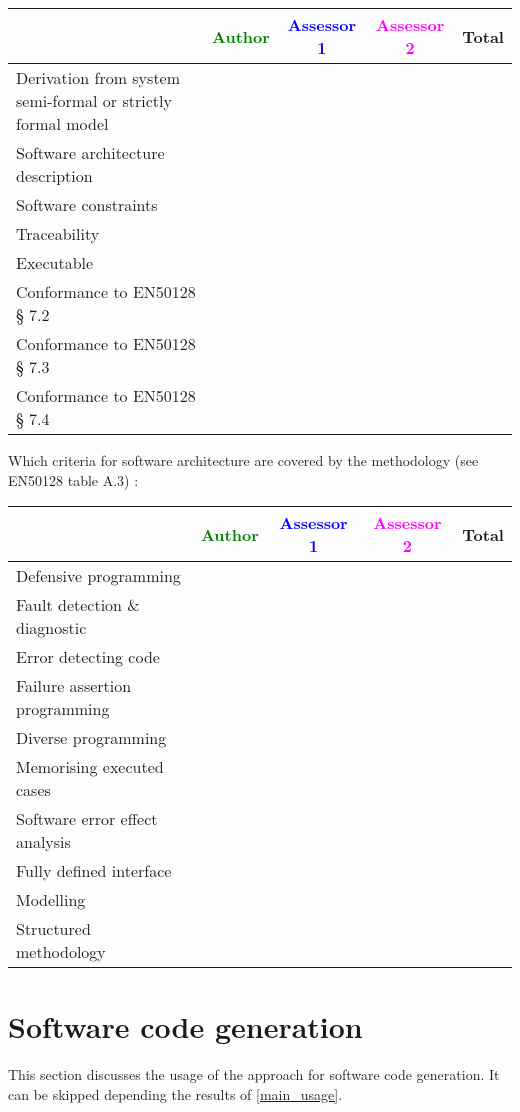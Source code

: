 \begin{tabular}{|l | c | c | c | c|}
\hline
& \textcolor{green}{Author} & \textcolor{blue}{Assessor 1} & \textcolor{magenta}{Assessor 2} & Total \\
\hline
Derivation from system semi-formal or strictly formal model  & & & &  \\
\hline 
Software architecture description  & & & &  \\
\hline
Software constraints  & & & &  \\
\hline
Traceability  & & & &  \\
\hline
Executable  & & & &  \\
\hline
Conformance to EN50128 § 7.2  & & & &  \\
\hline
Conformance to EN50128 § 7.3  & & & &  \\
\hline
Conformance to EN50128 § 7.4  & & & &  \\
\hline
\end{tabular}

Which criteria for software architecture are covered by the methodology
(see EN50128 table A.3) :

\begin{tabular}{|l | c | c | c | c|}
\hline
& \textcolor{green}{Author} & \textcolor{blue}{Assessor 1} & \textcolor{magenta}{Assessor 2} & Total \\
\hline
Defensive programming  & & & &  \\
\hline 
Fault detection \& diagnostic  & & & &  \\
\hline
Error detecting code  & & & &  \\
\hline
Failure assertion programming & & & &  \\
\hline
Diverse programming & & & &  \\
\hline
Memorising executed cases & & & &  \\
\hline
Software error effect analysis & & & &  \\
\hline
Fully defined interface & & & &  \\
\hline
Modelling  & & & &  \\
\hline
Structured methodology & & & &  \\
\hline
\end{tabular}

\section{Software code generation}
This section discusses the usage of the approach for software code generation.
It can be skipped depending the results of \ref{main_usage}.

